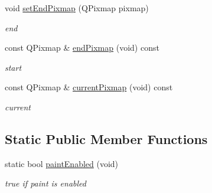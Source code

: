 \begin{Indent}
\begin{DoxyCompactItemize}
\mbox{\label{class_transition_widget_a0fe646179b908f621a734a4a0bb5e035}} 
void \hyperlink{class_transition_widget_a0fe646179b908f621a734a4a0bb5e035}{set\+End\+Pixmap} (Q\+Pixmap pixmap)
\begin{DoxyCompactList}\small\item\em end \end{DoxyCompactList}\item 
\mbox{\label{class_transition_widget_a982ff317d1c89609cfe70475392307b4}} 
const Q\+Pixmap \& \hyperlink{class_transition_widget_a982ff317d1c89609cfe70475392307b4}{end\+Pixmap} (void) const
\begin{DoxyCompactList}\small\item\em start \end{DoxyCompactList}\item 
\mbox{\label{class_transition_widget_ac12cbf75ae08cad0520623e07ec28b89}} 
const Q\+Pixmap \& \hyperlink{class_transition_widget_ac12cbf75ae08cad0520623e07ec28b89}{current\+Pixmap} (void) const
\begin{DoxyCompactList}\small\item\em current \end{DoxyCompactList}\end{DoxyCompactItemize}
\end{Indent}
\subsection*{Static Public Member Functions}
\begin{DoxyCompactItemize}
\item 
\mbox{\label{class_transition_widget_aef09ebd23b6e64d11a59bbaf95504952}} 
static bool \hyperlink{class_transition_widget_aef09ebd23b6e64d11a59bbaf95504952}{paint\+Enabled} (void)
\begin{DoxyCompactList}\small\item\em true if paint is enabled \end{DoxyCompactList}\end{DoxyCompactItemize}
